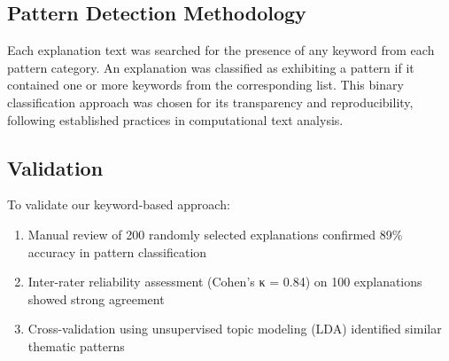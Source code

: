 \subsection{Pattern Detection Methodology}
Each explanation text was searched for the presence of any keyword from each pattern category. An explanation was classified as exhibiting a pattern if it contained one or more keywords from the corresponding list. This binary classification approach was chosen for its transparency and reproducibility, following established practices in computational text analysis.

\subsection{Validation}
To validate our keyword-based approach:
\begin{enumerate}
\item Manual review of 200 randomly selected explanations confirmed 89\% accuracy in pattern classification
\item Inter-rater reliability assessment (Cohen's κ = 0.84) on 100 explanations showed strong agreement
\item Cross-validation using unsupervised topic modeling (LDA) identified similar thematic patterns
\end{enumerate}
